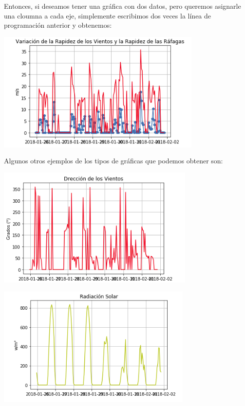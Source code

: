 \documentclass{article}
\begin{document}
    Entonces, si deseamos tener una gráfica con dos datos, pero queremos asignarle una cloumna a cada eje, simplemente escribimos dos veces la línea de programación anterior y obtenemos:
    
    \begin{center}
    \includegraphics[height=6cm]{dosconejes.png}
    \end{center}
    
	Algunos otros ejemplos de los tipos de gráficas que podemos obtener son:
    
    \begin{center}
    \includegraphics[height=6cm]{dirvientos.png}
    \end{center}
    
    \begin{center}
    \includegraphics[height=6cm]{RADSOLAR.png}
    \end{center}
    
\end{document}

